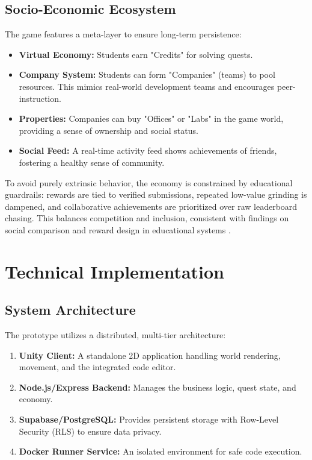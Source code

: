 \documentclass[a4paper, UKenglish, cleveref, autoref, thm-restate]{oasics-v2021}
\begin{document}
\subsection{Socio-Economic Ecosystem}
The game features a meta-layer to ensure long-term persistence:
\begin{itemize}
    \item \textbf{Virtual Economy:} Students earn "Credits" for solving quests.
    \item \textbf{Company System:} Students can form "Companies" (teams) to pool resources. This mimics real-world development teams and encourages peer-instruction.
    \item \textbf{Properties:} Companies can buy "Offices" or "Labs" in the game world, providing a sense of ownership and social status.
    \item \textbf{Social Feed:} A real-time activity feed shows achievements of friends, fostering a healthy sense of community.
\end{itemize}

To avoid purely extrinsic behavior, the economy is constrained by educational guardrails: rewards are tied to verified submissions, repeated low-value grinding is dampened, and collaborative achievements are prioritized over raw leaderboard chasing. This balances competition and inclusion, consistent with findings on social comparison and reward design in educational systems \cite{sosnovsky2020socialcomparison,park2021leaderboard}.

\section{Technical Implementation}
\subsection{System Architecture}
The prototype utilizes a distributed, multi-tier architecture:
\begin{enumerate}
    \item \textbf{Unity Client:} A standalone 2D application handling world rendering, movement, and the integrated code editor.
    \item \textbf{Node.js/Express Backend:} Manages the business logic, quest state, and economy.
    \item \textbf{Supabase/PostgreSQL:} Provides persistent storage with Row-Level Security (RLS) to ensure data privacy.
    \item \textbf{Docker Runner Service:} An isolated environment for safe code execution.
\end{enumerate}
\end{document}
